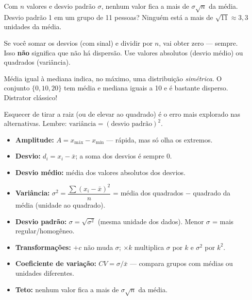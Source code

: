 \begin{macete}
Com $n$ valores e desvio padrão $\sigma$, nenhum valor fica a mais de $\sigma\sqrt{n}$ da média.
Desvio padrão 1 em um grupo de 11 pessoas? Ninguém está a mais de $\sqrt{11} \approx 3{,}3$ unidades
da média.
\end{macete}

\begin{atencao}
Se você somar os desvios (com sinal) e dividir por $n$, vai obter zero — sempre. Isso \textbf{não}
significa que não há dispersão. Use valores absolutos (desvio médio) ou quadrados (variância).
\end{atencao}

\begin{atencao}
Média igual à mediana indica, no máximo, uma distribuição \emph{simétrica}. O conjunto
$\{0, 10, 20\}$ tem média e mediana iguais a 10 e é bastante disperso. Distrator clássico!
\end{atencao}

\begin{atencao}
Esquecer de tirar a raiz (ou de elevar ao quadrado) é o erro mais explorado nas alternativas. Lembre:
$\text{variância} = (\text{desvio padrão})^2$.
\end{atencao}

\begin{resumo}
\begin{itemize}[leftmargin=1.2em,itemsep=2pt]
  \item \textbf{Amplitude:} $A = x_{\text{máx}} - x_{\text{mín}}$ — rápida, mas só olha os extremos.
  \item \textbf{Desvio:} $d_i = x_i - \bar{x}$; a soma dos desvios é sempre 0.
  \item \textbf{Desvio médio:} média dos valores absolutos dos desvios.
  \item \textbf{Variância:} $\sigma^2 = \dfrac{\sum (x_i - \bar{x})^2}{n}$ = média dos quadrados $-$ quadrado da média (unidade ao quadrado).
  \item \textbf{Desvio padrão:} $\sigma = \sqrt{\sigma^2}$ (mesma unidade dos dados). Menor $\sigma$ = mais regular/homogêneo.
  \item \textbf{Transformações:} $+c$ não muda $\sigma$; $\times k$ multiplica $\sigma$ por $k$ e $\sigma^2$ por $k^2$.
  \item \textbf{Coeficiente de variação:} $CV = \sigma / \bar{x}$ — compara grupos com médias ou unidades diferentes.
  \item \textbf{Teto:} nenhum valor fica a mais de $\sigma\sqrt{n}$ da média.
\end{itemize}
\end{resumo}

